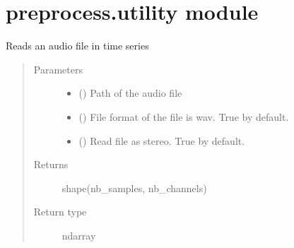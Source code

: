 \documentclass[letterpaper,10pt,english,openany,oneside]{sphinxmanual}
\begin{document}
\section{preprocess.utility module}
\label{\detokenize{docs/source/preprocess:module-preprocess.utility}}\label{\detokenize{docs/source/preprocess:preprocess-utility-module}}

\begin{fulllineitems}
\label{\detokenize{docs/source/preprocess:preprocess.utility.read}}
Reads an audio file in time series
\begin{quote}\begin{description}
\item[{Parameters}] \leavevmode\begin{itemize}
\item {} 
 () \textendash{} Path of the audio file

\item {} 
 () \textendash{} File format of the file is wav.
True by default.

\item {} 
 () \textendash{} Read file as stereo. True by default.

\end{itemize}

\item[{Returns}] \leavevmode
shape(nb\_samples, nb\_channels)

\item[{Return type}] \leavevmode
ndarray

\end{description}\end{quote}

\end{fulllineitems}

\end{document}
